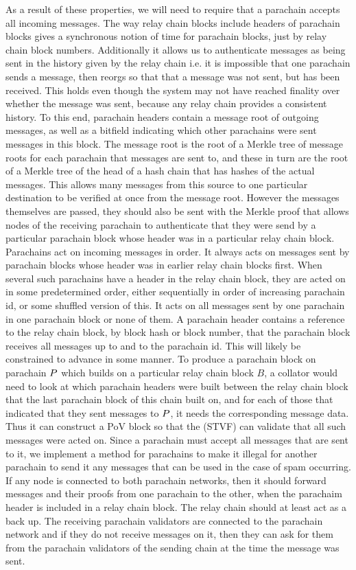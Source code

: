 As a result of these properties, we will need to require that a parachain accepts all incoming messages.
The way relay chain blocks include headers of parachain blocks gives a synchronous notion of time for parachain blocks,
just by relay chain block numbers. Additionally it allows us to authenticate messages as being sent in the history given by the relay chain
i.e. it is impossible that one parachain sends a message, then reorgs so that that a message was not sent, but has been received. This holds even though the system may not have reached finality over whether the message was sent, because any relay chain provides a consistent history.
To this end, parachain headers contain a message root of outgoing messages, as well as a bitfield indicating which other parachains were sent messages in this block.
The message root is the root of a Merkle tree of message roots for each parachain that messages are sent to,
and these in turn are the root of a Merkle tree of the head of a hash chain that has hashes of the actual messages. This allows many messages from this source to one particular destination  to be verified at once from the message root.
However the messages themselves are passed, they should also be sent with the Merkle proof that allows nodes of the receiving parachain
to authenticate that they were send by a particular parachain block whose header was in a particular relay chain block. Parachains act on incoming messages in order. It always acts on messages sent by parachain blocks whose header was in earlier relay chain blocks first. When several such parachains have a header in the relay chain block, they are acted on in some predetermined order, either sequentially in order of increasing parachain id, or some shuffled version of this. It acts on all messages sent by one parachain in one parachain block or none of them. A parachain header contains a reference to the relay chain block, by block hash or block number, that the parachain block receives all messages up to and to the parachain id.
This will likely be constrained to advance in some manner. To produce a parachain block on parachain $P$ which builds on a particular relay chain block $B$,
a collator would need to look at which parachain headers were built between the relay chain block that the last parachain block of this chain built on,
and for each of those that indicated that they sent messages to $P$, it needs the corresponding message data.
Thus it can construct a PoV block so that the (STVF) can validate that all such messages were acted on. Since a parachain must accept all messages that are sent to it,
we implement a method for parachains to make it illegal for another parachain to send it any messages that can be used in the case of spam occurring. If any node is connected to both parachain networks, then it should forward messages and their proofs from one parachain to the other,
when the parachaim header is included in a relay chain block. The relay chain should at least act as a back up.
The receiving parachain validators are connected to the parachain network and if they do not receive messages on it, then they can ask for them from the parachain validators of the sending chain at the time the message was sent.
